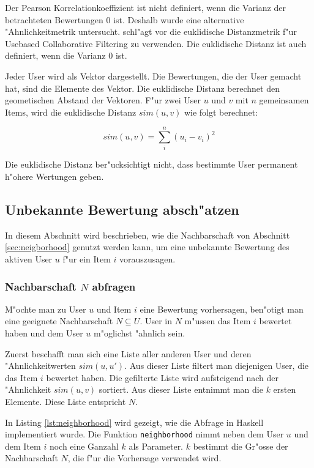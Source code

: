 \documentclass[a4paper, 12pt]{article}
\begin{document}
Der Pearson Korrelationkoeffizient ist nicht definiert, wenn die Varianz der betrachteten Bewertungen 0 ist. Deshalb wurde eine alternative "Ahnlichkeitmetrik untersucht. \cite{segaran} schl"agt vor die euklidische Distanzmetrik f"ur Usebased Collaborative Filtering zu verwenden. Die euklidische Distanz ist auch definiert, wenn die Varianz 0 ist.

Jeder User wird als Vektor dargestellt. Die Bewertungen, die der User gemacht hat, sind die Elemente des Vektor. Die euklidische Distanz berechnet den geometischen Abstand der Vektoren. F"ur zwei User $u$ und $v$ mit $n$ gemeinsamen Items, wird die euklidische Distanz $sim(u,v)$ wie folgt berechnet:

\begin{equation}
  \label{eq:euclid}
 sim(u,v) = \sum_i^n (u_i - v_i )^2
\end{equation}

Die euklidische Distanz ber"ucksichtigt nicht, dass bestimmte User permanent h"ohere Wertungen geben.

\subsection{Unbekannte Bewertung absch"atzen}
\label{sec:compp}

In diesem Abschnitt wird beschrieben, wie die Nachbarschaft von Abschnitt \ref{sec:neigborhood} genutzt werden kann, um eine unbekannte Bewertung des aktiven User $u$ f"ur ein Item $i$ vorauszusagen.

\subsubsection{Nachbarschaft $N$ abfragen}
\label{sec:generate}

M"ochte man zu User $u$ und Item $i$ eine Bewertung vorhersagen, ben"otigt man eine geeignete Nachbarschaft $N \subseteq U$. User in $N$ m"ussen das Item $i$ bewertet haben und dem User $u$ m"oglichst "ahnlich sein.

Zuerst beschafft man sich eine Liste aller anderen User und deren "Ahnlichkeitwerten $sim(u,u
')$. Aus dieser Liste filtert man diejenigen User, die das Item $i$ bewertet haben. Die gefilterte Liste wird aufsteigend nach der "Ahnlichkeit $sim(u,v)$ sortiert. Aus dieser Liste entnimmt man die $k$ ersten Elemente. Diese Liste entspricht $N$. 

In Listing \ref{lst:neighborhood} wird gezeigt, wie die Abfrage in Haskell implementiert wurde. Die Funktion \verb|neighborhood| nimmt neben dem User $u$ und dem Item $i$ noch eine Ganzahl $k$ als Parameter. $k$ bestimmt die Gr"osse der Nachbarschaft $N$, die f"ur die Vorhersage verwendet wird.
\end{document}
